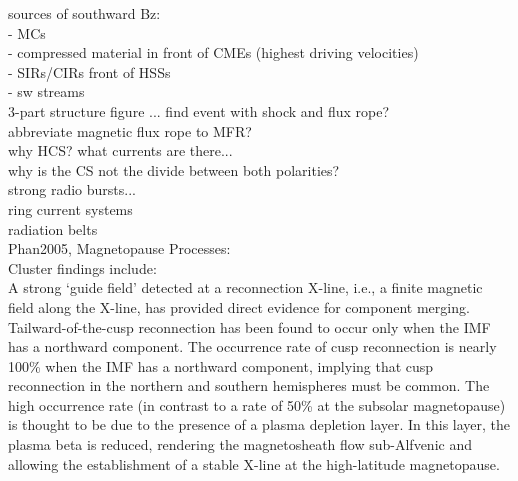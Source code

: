 

sources of southward Bz:\\
- MCs\\
- compressed material in front of CMEs (highest driving velocities)\\
- SIRs/CIRs front of HSSs\\
- sw streams\\


3-part structure figure ... find event with shock and flux rope?\\
abbreviate magnetic flux rope to MFR?\\
 
why HCS? what currents are there...\\
why is the CS not the divide between both polarities?\\

strong radio bursts...\\

ring current systems\\

radiation belts\\

Phan2005, Magnetopause Processes:\\
Cluster findings include:\\
A strong ‘guide field’ detected at a reconnection X-line, i.e., a finite magnetic field along the X-line, has provided direct evidence for component merging.\\
Tailward-of-the-cusp reconnection has been found to occur only when the IMF has a northward component. The occurrence rate of cusp reconnection is nearly 100\% when the IMF has a northward component, implying that cusp reconnection in the northern and southern hemispheres must be common. The high occurrence rate (in contrast to a rate of 50\% at the subsolar magnetopause) is thought to be due to the presence of a plasma depletion layer. In this layer, the plasma beta is reduced, rendering the magnetosheath flow sub-Alfvenic and allowing the establishment of a stable X-line at the high-latitude magnetopause.\\

